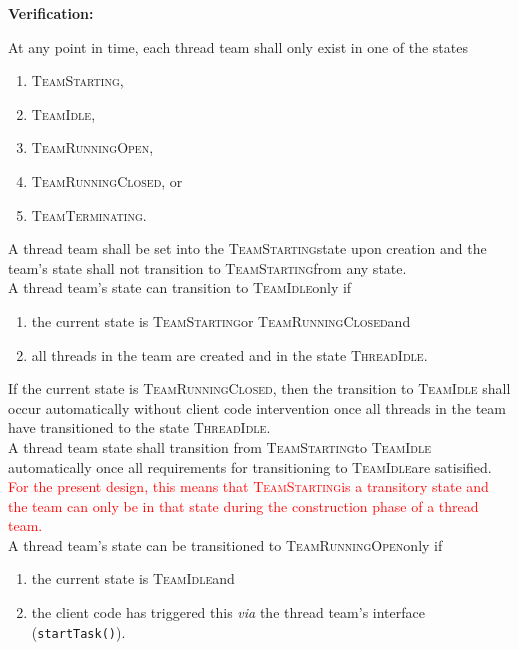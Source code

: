 \documentclass{article}
\newcommand{\TeamStarting}      {\textsc{TeamStarting}}
\newcommand{\TeamIdle}          {\textsc{TeamIdle}}
\newcommand{\TeamRunningOpen}   {\textsc{TeamRunningOpen}}
\newcommand{\TeamRunningClosed} {\textsc{TeamRunningClosed}}
\newcommand{\TeamTerminating}   {\textsc{TeamTerminating}}
\newcommand{\ThreadIdle}        {\textsc{ThreadIdle}}
\begin{document}
\begin{req}
\end{req}
\textbf{Verification:}\hspace{0.125in}



At any point in time, each thread team shall only exist in one of the states
\begin{enumerate}
\item{\TeamStarting,}
\item{\TeamIdle,}
\item{\TeamRunningOpen,}
\item{\TeamRunningClosed, or}
\item{\TeamTerminating.}
\end{enumerate}

A thread team shall be set into the \TeamStarting state upon creation and the
team's state shall not transition to \TeamStarting from any state. \\

A thread team's state can transition to \TeamIdle only if
\begin{enumerate}
\item{the current state is \TeamStarting or \TeamRunningClosed and}
\item{all threads in the team are created and in the state \ThreadIdle.}
\end{enumerate}
If the current state is \TeamRunningClosed, then the transition to \TeamIdle
shall occur automatically without client code intervention once all threads in
the team have transitioned to the state \ThreadIdle.\\

A thread team state shall transition from \TeamStarting to \TeamIdle
automatically once all requirements for transitioning to \TeamIdle are
satisified.  \textcolor{red}{For the present design, this means that
\TeamStarting is a transitory state and the team can only be in that state
during the construction phase of a thread team.}\\

A thread team's state can be transitioned to \TeamRunningOpen only if
\begin{enumerate}
\item{the current state is \TeamIdle and}
\item{the client code has triggered this \textit{via} the thread team's
interface (\texttt{startTask()}).}
\end{enumerate}
\end{document}
